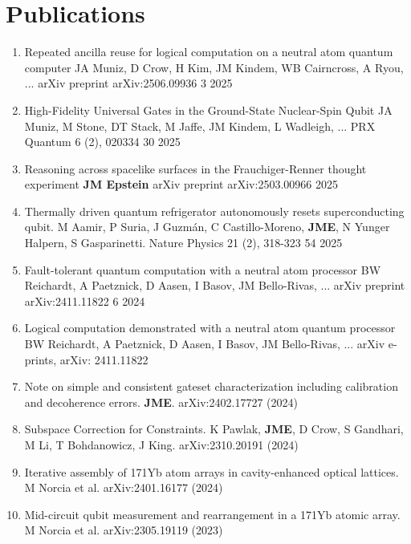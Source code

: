 \documentclass{article}
\begin{document}
	

	
	
	
	\section{Publications}
	\begin{refsection}
		\nocite{*}
		\printbibliography[heading=none]
		\begin{enumerate}
			
			\item Repeated ancilla reuse for logical computation on a neutral atom quantum computer
			JA Muniz, D Crow, H Kim, JM Kindem, WB Cairncross, A Ryou, ...
			arXiv preprint arXiv:2506.09936
			3	2025
			\item High-Fidelity Universal Gates in the  Ground-State Nuclear-Spin Qubit
			JA Muniz, M Stone, DT Stack, M Jaffe, JM Kindem, L Wadleigh, ...
			PRX Quantum 6 (2), 020334
			30	2025
			\item Reasoning across spacelike surfaces in the Frauchiger-Renner thought experiment
			\textbf{JM Epstein}
			arXiv preprint arXiv:2503.00966
			2025
			
			\item  Thermally driven quantum refrigerator autonomously resets superconducting qubit. M Aamir, P Suria, J Guzmán, C
			Castillo-Moreno, \textbf{JME}, N Yunger Halpern, S Gasparinetti. Nature Physics 21 (2), 318-323
			54	2025
			
			\item Fault-tolerant quantum computation with a neutral atom processor
			BW Reichardt, A Paetznick, D Aasen, I Basov, JM Bello-Rivas, ...
			arXiv preprint arXiv:2411.11822
			6	2024
			\item Logical computation demonstrated with a neutral atom quantum processor
			BW Reichardt, A Paetznick, D Aasen, I Basov, JM Bello-Rivas, ...
			arXiv e-prints, arXiv: 2411.11822
			
			
		\item Note on simple and consistent gateset characterization including calibration and decoherence errors. \textbf{JME}.
		arXiv:2402.17727 (2024)
		\item Subspace Correction for Constraints. K Pawlak, \textbf{JME}, D Crow, S Gandhari, M Li, T Bohdanowicz, J King.
		arXiv:2310.20191 (2024)
		\item Iterative assembly of 171Yb atom arrays in cavity-enhanced optical lattices. M Norcia et al. arXiv:2401.16177 (2024)
		\item  Mid-circuit qubit measurement and rearrangement in a 171Yb atomic array. M Norcia et al. arXiv:2305.19119 (2023)
	

\end{enumerate}
\end{refsection}
\end{document}
